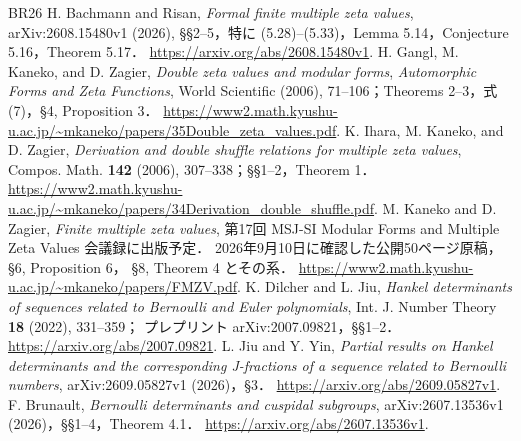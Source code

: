 \documentclass[12pt]{amsart}
\theoremstyle{definition}
\theoremstyle{remark}
\numberwithin{equation}{section}
\theoremstyle{definition}
\theoremstyle{remark}
\begin{document}
\begin{thebibliography}{BR26}
 H. Bachmann and Risan,
\emph{Formal finite multiple zeta values}, arXiv:2608.15480v1 (2026),
\S\S2--5，特に (5.28)--(5.33)，Lemma 5.14，Conjecture 5.16，Theorem 5.17．
\url{https://arxiv.org/abs/2608.15480v1}.
 H. Gangl, M. Kaneko, and D. Zagier,
\emph{Double zeta values and modular forms},
\emph{Automorphic Forms and Zeta Functions}, World Scientific (2006),
71--106；Theorems 2--3，式 (7)，\S4, Proposition 3．
\url{https://www2.math.kyushu-u.ac.jp/~mkaneko/papers/35Double_zeta_values.pdf}.
 K. Ihara, M. Kaneko, and D. Zagier,
\emph{Derivation and double shuffle relations for multiple zeta values},
Compos. Math. \textbf{142} (2006), 307--338；\S\S1--2，Theorem 1．
\url{https://www2.math.kyushu-u.ac.jp/~mkaneko/papers/34Derivation_double_shuffle.pdf}.
 M. Kaneko and D. Zagier,
\emph{Finite multiple zeta values}, 第17回 MSJ-SI
Modular Forms and Multiple Zeta Values 会議録に出版予定．
2026年9月10日に確認した公開50ページ原稿，\S6, Proposition 6，
\S8, Theorem 4 とその系．
\url{https://www2.math.kyushu-u.ac.jp/~mkaneko/papers/FMZV.pdf}.
 K. Dilcher and L. Jiu,
\emph{Hankel determinants of sequences related to Bernoulli and Euler
polynomials}, Int. J. Number Theory \textbf{18} (2022), 331--359；
プレプリント arXiv:2007.09821，\S\S1--2．
\url{https://arxiv.org/abs/2007.09821}.
 L. Jiu and Y. Yin,
\emph{Partial results on Hankel determinants and the corresponding
J-fractions of a sequence related to Bernoulli numbers},
arXiv:2609.05827v1 (2026)，\S3．
\url{https://arxiv.org/abs/2609.05827v1}.
 F. Brunault,
\emph{Bernoulli determinants and cuspidal subgroups},
arXiv:2607.13536v1 (2026)，\S\S1--4，Theorem 4.1．
\url{https://arxiv.org/abs/2607.13536v1}.
\end{thebibliography}

\end{document}
